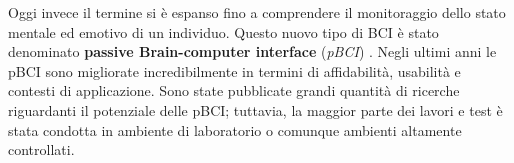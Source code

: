\noindent Oggi invece il termine si è espanso fino a comprendere il monitoraggio dello stato mentale ed emotivo di un individuo. Questo nuovo tipo di BCI è stato denominato {\bf passive Brain-computer interface} (\emph{pBCI}) \cite{pbci}.\newline
Negli ultimi anni le pBCI sono migliorate incredibilmente in termini di affidabilità, usabilità e contesti di applicazione.\newline
Sono state pubblicate grandi quantità di ricerche riguardanti il potenziale delle pBCI; tuttavia, la maggior parte dei lavori e test è stata condotta in ambiente di laboratorio o comunque ambienti altamente controllati.\newline
